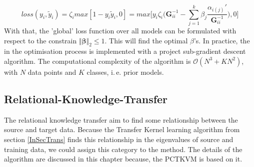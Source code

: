 \begin{equation}
	loss(y_i,\tilde{y}_i)= \zeta_i max[1-y_i\tilde{y}_i,0] = max \bigg[y_i\zeta_i\bigg({\mathbf{G}^{-1}_{ii}} - \sum_{j=1}^{k}\beta_j \frac{\alpha_{i(j)}'}{\mathbf{G}^{-1}_{ii}}\bigg),0\bigg]
\end{equation}
With that, the 'global' loss function over all models can be formulated with respect to the constrain $\Vert\boldsymbol{\beta}\Vert_2\le 1$.
This will find the optimal $\beta$'s.
In practice, the in the optimisation process is implemented with a project sub-gradient descent algorithm.\cite{Tommasi.}
The computational complexity of the algorithm is $\mathcal{O}(N^3+KN^2)$, with $N$ data points and $K$ classes, i.\,e. prior models.
\subsection{Relational-Knowledge-Transfer}\label{TlSubSecRelation}
The relational knowledge transfer aim to find some relationship between the source and target data.\cite[p. 7]{Weiss.2016}
Because the Transfer Kernel learning algorithm from section \ref{InSecTrans} finds this relationship in the eigenvalues of source and training data, we could assign this category to the method.
The details of the algorithm are discussed in this chapter because, the \acl{PCTKVM} is based on it.

